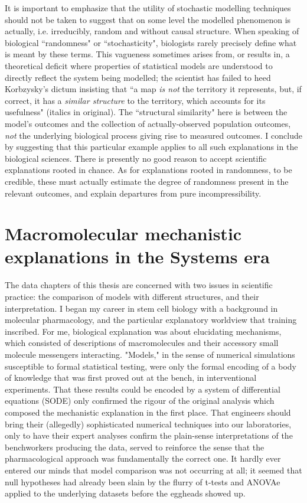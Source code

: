 It is important to emphasize that the utility of stochastic modelling techniques should not be taken to suggest that on some level the modelled phenomenon is actually, i.e. irreducibly, random and without causal structure. When speaking of biological ``randomness" or ``stochasticity", biologists rarely precisely define what is meant by these terms. This vagueness sometimes arises from, or results in, a theoretical deficit where properties of statistical models are understood to directly reflect the system being modelled; the scientist has failed to heed Korbzysky's dictum insisting that ``a map \textit{is not} the territory it represents, but, if correct, it has a \textit{similar structure} to the territory, which accounts for its usefulness" \cite{Korzybski2005} (italics in original). The ``structural similarity" here is between the model's outcomes and the collection of actually-observed population outcomes, \textit{not} the underlying biological process giving rise to measured outcomes. I conclude by suggesting that this particular example applies to all such explanations in the biological sciences. There is presently no good reason to accept scientific explanations rooted in chance. As for explanations rooted in randomness, to be credible, these must actually estimate the degree of randomness present in the relevant outcomes, and explain departures from pure incompressibility.


\section{Macromolecular mechanistic explanations in the Systems era}

The data chapters of this thesis are concerned with two issues in scientific practice: the comparison of models with different structures, and their interpretation. I began my career in stem cell biology with a background in molecular pharmacology, and the particular explanatory worldview that training inscribed. For me, biological explanation was about elucidating mechanisms, which consisted of descriptions of macromolecules and their accessory small molecule messengers interacting. "Models," in the sense of numerical simulations susceptible to formal statistical testing, were only the formal encoding of a body of knowledge that was first proved out at the bench, in interventional experiments. That these results could be encoded by a system of differential equations (SODE) only confirmed the rigour of the original analysis which composed the mechanistic explanation in the first place. That engineers should bring their (allegedly) sophisticated numerical techniques into our laboratories, only to have their expert analyses confirm the plain-sense interpretations of the benchworkers producing the data, served to reinforce the sense that the pharmacological approach was fundamentally the correct one. It hardly ever entered our minds that model comparison was not occurring at all; it seemed that null hypotheses had already been slain by the flurry of t-tests and ANOVAe applied to the underlying datasets before the eggheads showed up.


